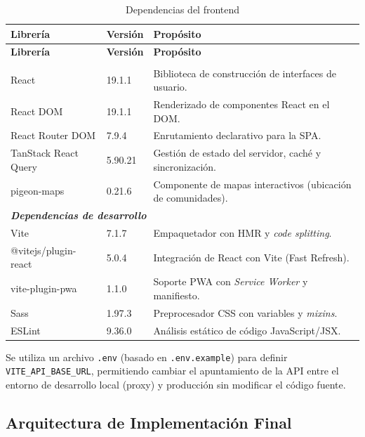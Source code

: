 \begin{longtable}{|p{}|p{}|p{}|}
\caption{Dependencias del frontend}\label{tab:deps-frontend}\\
\hline
\textbf{Librería} & \textbf{Versión} & \textbf{Propósito} \\
\hline
\endfirsthead
\hline
\textbf{Librería} & \textbf{Versión} & \textbf{Propósito} \\
\hline
\endhead
\hline
\endfoot

\multicolumn{3}{|l|}{\textit{\textbf{Dependencias de producción}}} \\
\hline
React & 19.1.1 & Biblioteca de construcción de interfaces de usuario. \\
\hline
React DOM & 19.1.1 & Renderizado de componentes React en el DOM. \\
\hline
React Router DOM & 7.9.4 & Enrutamiento declarativo para la SPA. \\
\hline
TanStack React Query & 5.90.21 & Gestión de estado del servidor, caché y sincronización. \\
\hline
pigeon-maps & 0.21.6 & Componente de mapas interactivos (ubicación de comunidades). \\
\hline

\multicolumn{3}{|l|}{\textit{\textbf{Dependencias de desarrollo}}} \\
\hline
Vite & 7.1.7 & Empaquetador con HMR y \textit{code splitting}. \\
\hline
@vitejs/plugin-react & 5.0.4 & Integración de React con Vite (Fast Refresh). \\
\hline
vite-plugin-pwa & 1.1.0 & Soporte PWA con \textit{Service Worker} y manifiesto. \\
\hline
Sass & 1.97.3 & Preprocesador CSS con variables y \textit{mixins}. \\
\hline
ESLint & 9.36.0 & Análisis estático de código JavaScript/JSX. \\

\end{longtable}

Se utiliza un archivo \texttt{.env} (basado en \texttt{.env.example}) para definir \texttt{VITE\_API\_BASE\_URL}, permitiendo cambiar el apuntamiento de la API entre el entorno de desarrollo local (proxy) y producción sin modificar el código fuente.

\subsection{Arquitectura de Implementación Final}

